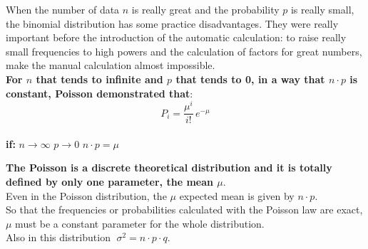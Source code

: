 
\begin{frame}
  \vspace*{.25cm}
  When the number of data $ n $ is really great and the probability $ p $ is really small, the binomial distribution has some practice disadvantages. They were really important before the introduction of the automatic calculation: to raise really small frequencies to high powers and the calculation of factors for great numbers, make the manual calculation almost impossible.\\
  \vspace*{.25cm}
  \textbf{For {\boldmath $ n $} that tends to infinite and {\boldmath $ p $} that tends to 0, in a way that $n \cdot p$ is constant, Poisson demonstrated that}:\\
  \vspace*{.25cm}
  $$ P_i = \frac{\mu^i}{i!}\, e^{-\mu} $$\\
  \vspace*{.5cm}
  \textbf{if:} \hspace{1 cm} $n\rightarrow \infty$ \hspace{1 cm} $p\rightarrow 0$ \hspace{1 cm} $n \cdot p = \mu$
\end{frame}

\begin{frame}
  \vspace*{.25cm}
  \textbf{The Poisson is a discrete theoretical distribution and it is totally defined by only one parameter, the mean {\boldmath $ \mu $}}.\\
  \vspace*{.5cm}
  Even in the Poisson distribution, the {\boldmath $ \mu $} expected mean is given by {\boldmath $n \cdot p $}.\\ 
  \vspace*{.5cm}
  So that the frequencies or probabilities calculated with the Poisson law are exact, $\mu$ must be a constant parameter for the whole distribution.\\
  \vspace*{.5cm}
  Also in this distribution {\boldmath $ \; \sigma^2 = n \cdot p \cdot q $}.\\
\end{frame}

